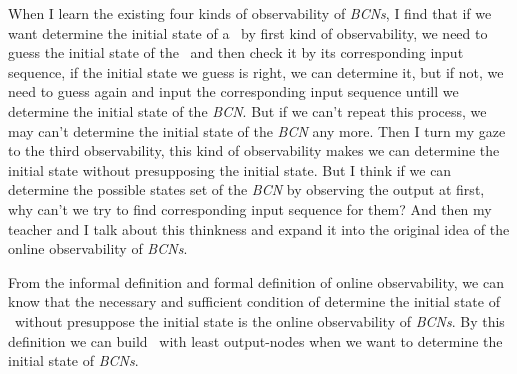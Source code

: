 When I learn the existing four kinds of observability of {\em BCNs}, I find that if we want determine the initial state of a \BCNs\ by first kind of observability, we need to guess the initial state of the \BCN\ and then check it by its corresponding input sequence, if the initial state we guess is right, we can determine it, but if not, we need to guess again and input the corresponding input sequence untill we determine the initial state of the {\em BCN}. But if we can't repeat this process, we may can't determine the initial state of the {\em BCN} any more. Then I turn my gaze to the third observability, this kind of observability makes we can determine the initial state without presupposing the initial state. But I think if we can determine the possible states set of the {\em BCN} by observing the output at first, why can't we try to find corresponding input sequence for them? And then my teacher and I talk about this thinkness and expand it into the original idea of the online observability of {\em BCNs}. 

From the informal definition and formal definition of online observability, we can know that the necessary and sufficient condition of determine the initial state of \BCNs\ without presuppose the initial state is the online observability of {\em BCNs}. By this definition we can build \BCNs\ with least output-nodes when we want to determine the initial state of {\em BCNs}.
